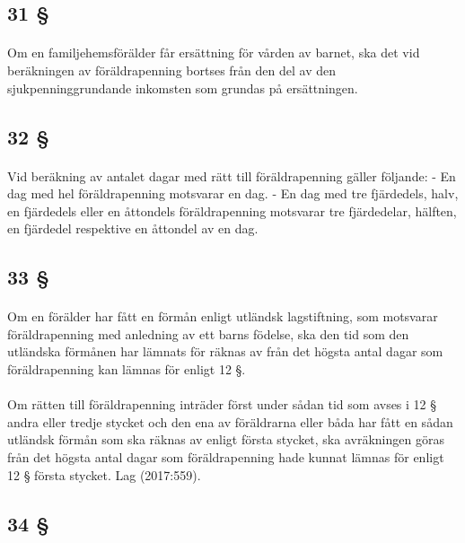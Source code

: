 \documentclass[a4paper,notitlepage,openany,10pt]{book}
\begin{document}
\subsection*{31 §}
\paragraph*{}
Om en familjehemsförälder får ersättning för vården av barnet, ska det vid beräkningen av föräldrapenning bortses från den del av den sjukpenninggrundande inkomsten som grundas på ersättningen.
\subsection*{32 §}
\paragraph*{}
Vid beräkning av antalet dagar med rätt till föräldrapenning gäller följande:
\newline - En dag med hel föräldrapenning motsvarar en dag.
\newline - En dag med tre fjärdedels, halv, en fjärdedels eller en åttondels föräldrapenning motsvarar tre fjärdedelar, hälften, en fjärdedel respektive en åttondel av en dag.
\subsection*{33 §}
\paragraph*{}
Om en förälder har fått en förmån enligt utländsk lagstiftning, som motsvarar föräldrapenning med anledning av ett barns födelse, ska den tid som den utländska förmånen har lämnats för räknas av från det högsta antal dagar som föräldrapenning kan lämnas för enligt 12 §.
\paragraph*{}
Om rätten till föräldrapenning inträder först under sådan tid som avses i 12 § andra eller tredje stycket och den ena av föräldrarna eller båda har fått en sådan utländsk förmån som ska räknas av enligt första stycket, ska avräkningen göras från det högsta antal dagar som föräldrapenning hade kunnat lämnas för enligt 12 § första stycket.
Lag (2017:559).
\subsection*{34 §}
\end{document}
